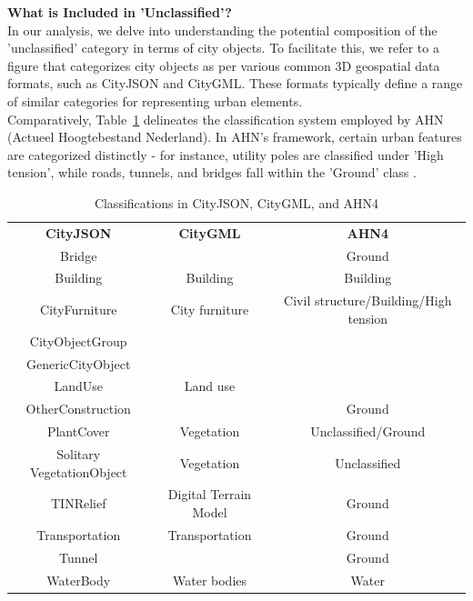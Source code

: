 \documentclass{article}
\begin{document}
\noindent \textbf{What is Included in 'Unclassified'?}\\
\noindent In our analysis, we delve into understanding the potential composition of the 'unclassified' category in terms of city objects. To facilitate this, we refer to a figure that categorizes city objects as per various common 3D geospatial data formats, such as CityJSON and CityGML. These formats typically define a range of similar categories for representing urban elements.\\

\noindent Comparatively, Table~\ref{table4} delineates the classification system employed by AHN (Actueel Hoogtebestand Nederland). In AHN's framework, certain urban features are categorized distinctly - for instance, utility poles are classified under 'High tension', while roads, tunnels, and bridges fall within the 'Ground' class    .\\

\begin{table}[H]
  \centering
  \caption{Classifications in CityJSON, CityGML, and AHN4}
  \label{table4}
  \small
  \begin{tabular}{c|c|c}
    \hline
    \textbf{CityJSON} & \textbf{CityGML} & \textbf{AHN4} \\
    \Xhline{1pt}
    Bridge & & Ground \\
    \Xhline{0.05pt}
    Building & Building & Building \\
    \Xhline{0.05pt}
    CityFurniture & City furniture & Civil structure/Building/High tension \\
    \Xhline{0.05pt}
    CityObjectGroup & & \\
    \Xhline{0.05pt}
    GenericCityObject & & \\
    \Xhline{0.05pt}
    LandUse & Land use & \\
    \Xhline{0.05pt}
    OtherConstruction & & Ground \\
    \Xhline{0.05pt}
    PlantCover & Vegetation & Unclassified/Ground \\
    \Xhline{0.05pt}
    Solitary VegetationObject & Vegetation & Unclassified \\
    \Xhline{0.05pt}
    TINRelief & Digital Terrain Model & Ground \\
    \Xhline{0.05pt}
    Transportation & Transportation & Ground \\
    \Xhline{0.05pt}
    Tunnel & & Ground \\
    \Xhline{0.05pt}
    WaterBody & Water bodies & Water \\
    \hline
  \end{tabular}
\end{table}
\end{document}

